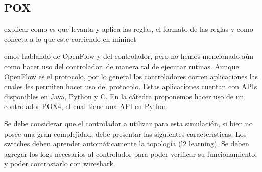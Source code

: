 \documentclass{article}
\begin{document}
\subsection{POX}\label{pox}
explicar como es que levanta y aplica las reglas, el formato de las reglas
y como conecta a lo que este corriendo en mininet


emos hablando de OpenFlow y del controlador, pero no hemos mencionado aún como hacer uso del controlador, de
manera tal de ejecutar rutinas. Aunque OpenFlow es el protocolo, por lo general los controladores corren aplicaciones las
cuales les permiten hacer uso del protocolo. Estas aplicaciones cuentan con APIs disponibles en Java, Python y C.
En la cátedra proponemos hacer uso de un controlador POX4, el cual tiene una API en Python



Se debe considerar que el controlador a utilizar para esta simulación, si bien no posee una gran complejidad, debe
presentar las siguientes características:
Los switches deben aprender automáticamente la topología (l2 learning).
Se deben agregar los logs necesarios al controlador para poder verificar su funcionamiento, y poder contrastarlo con
wireshark.
\end{document}
